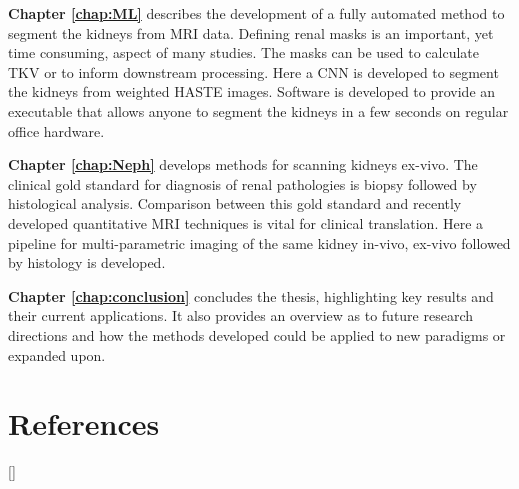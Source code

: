 \textbf{Chapter \ref{chap:ML}} describes the development of a fully automated method to segment the kidneys from \ac{MRI} data. Defining renal masks is an important, yet time consuming, aspect of many studies. The masks can be used to calculate \ac{TKV} or to inform downstream processing. Here a \ac{CNN} is developed to segment the kidneys from \ttwo weighted \ac{HASTE} images. Software is developed to provide an executable that allows anyone to segment the kidneys in a few seconds on regular office hardware.

\textbf{Chapter \ref{chap:Neph}} develops methods for scanning kidneys ex-vivo. The clinical gold standard for diagnosis of renal pathologies is biopsy followed by histological analysis. Comparison between this gold standard and recently developed quantitative \ac{MRI} techniques is vital for clinical translation. Here a pipeline for multi-parametric imaging of the same kidney in-vivo, ex-vivo followed by histology is developed.

\textbf{Chapter \ref{chap:conclusion}} concludes the thesis, highlighting key results and their current applications. It also provides an overview as to future research directions and how the methods developed could be applied to new paradigms or expanded upon.

\newpage
\section{References}
[\refname]{}
\printbibliography